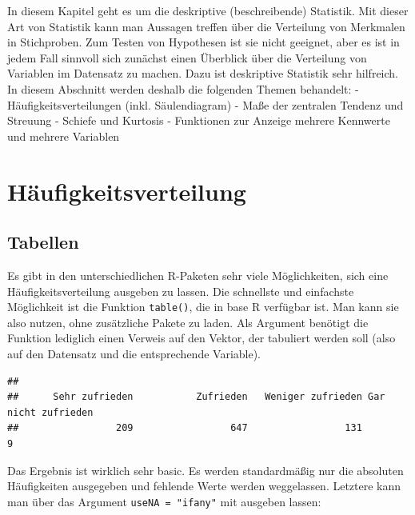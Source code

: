 \documentclass[
]{book}
\newenvironment{Shaded}{\begin{snugshade}}{\end{snugshade}}
\newcommand{\CommentTok}[1]{\textcolor[rgb]{0.56,0.35,0.01}{\textit{#1}}}
\newcommand{\FunctionTok}[1]{\textcolor[rgb]{0.00,0.00,0.00}{#1}}
\newcommand{\NormalTok}[1]{#1}
\newcommand{\SpecialCharTok}[1]{\textcolor[rgb]{0.00,0.00,0.00}{#1}}
\begin{document}
In diesem Kapitel geht es um die deskriptive (beschreibende) Statistik. Mit dieser Art von Statistik kann man Aussagen treffen über die Verteilung von Merkmalen in Stichproben. Zum Testen von Hypothesen ist sie nicht geeignet, aber es ist in jedem Fall sinnvoll sich zunächst einen Überblick über die Verteilung von Variablen im Datensatz zu machen. Dazu ist deskriptive Statistik sehr hilfreich. In diesem Abschnitt werden deshalb die folgenden Themen behandelt:
- Häufigkeitsverteilungen (inkl. Säulendiagram)
- Maße der zentralen Tendenz und Streuung
- Schiefe und Kurtosis
- Funktionen zur Anzeige mehrere Kennwerte und mehrere Variablen

\hypertarget{huxe4ufigkeitsverteilung}{%
\section{Häufigkeitsverteilung}\label{huxe4ufigkeitsverteilung}}

\hypertarget{tabellen}{%
\subsection{Tabellen}\label{tabellen}}

Es gibt in den unterschiedlichen R-Paketen sehr viele Möglichkeiten, sich eine Häufigkeitsverteilung ausgeben zu lassen. Die schnellste und einfachste Möglichkeit ist die Funktion \texttt{table()}, die in base R verfügbar ist. Man kann sie also nutzen, ohne zusätzliche Pakete zu laden. Als Argument benötigt die Funktion lediglich einen Verweis auf den Vektor, der tabuliert werden soll (also auf den Datensatz und die entsprechende Variable).

\begin{Shaded}
\end{Shaded}

\begin{verbatim}
## 
##      Sehr zufrieden           Zufrieden   Weniger zufrieden Gar nicht zufrieden 
##                 209                 647                 131                   9
\end{verbatim}

Das Ergebnis ist wirklich sehr basic. Es werden standardmäßig nur die absoluten Häufigkeiten ausgegeben und fehlende Werte werden weggelassen. Letztere kann man über das Argument \texttt{useNA\ =\ "ifany"} mit ausgeben lassen:
\end{document}
